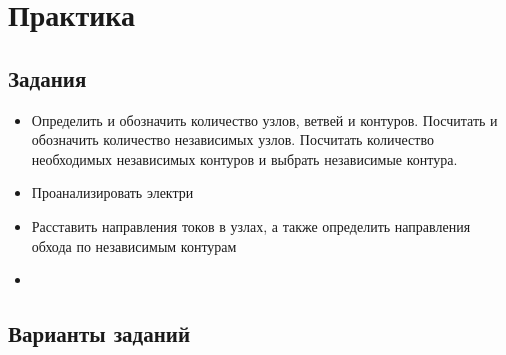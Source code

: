 \section{Практика}
\subsection{Задания}
\begin{itemize}
    \item Определить и обозначить количество узлов, ветвей и контуров. Посчитать и обозначить количество независимых узлов. Посчитать количество необходимых независимых контуров и выбрать независимые контура.
    \item Проанализировать электри
    \item Расставить направления токов в узлах, а также определить направления обхода по независимым контурам
    \item 
\end{itemize}


\subsection{Варианты заданий}

